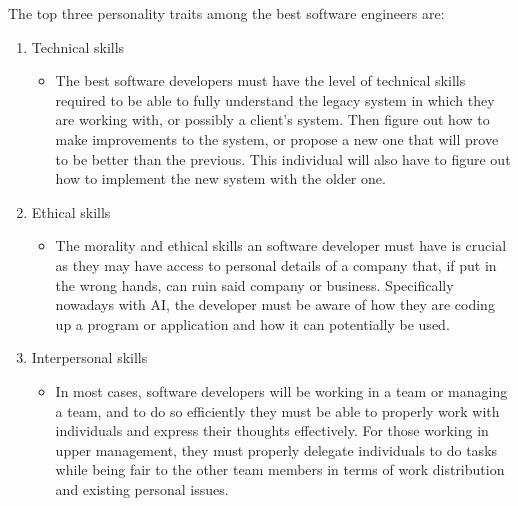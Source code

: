 	The top three personality traits among the best software engineers are:
	\begin{enumerate}
		\item Technical skills
			\begin{itemize}
				\item The best software developers must have the level of technical skills required to be able to fully understand the legacy system in which they are working with, or possibly a client's system. Then figure out how to make improvements to the system, or propose a new one that will prove to be better than the previous. This individual will also have to figure out how to implement the new system with the older one.
			\end{itemize}
		\item Ethical skills
			\begin{itemize}
				\item The morality and ethical skills an software developer must have is crucial as they may have access to personal details of a company that, if put in the wrong hands, can ruin said company or business. Specifically nowadays with AI, the developer must be aware of how they are coding up a program or application and how it can potentially be used. 
			\end{itemize}
		\item Interpersonal skills
			\begin{itemize}
				\item In most cases, software developers will be working in a team or managing a team, and to do so efficiently they must be able to properly work with individuals and express their thoughts effectively. For those working in upper management, they must properly delegate individuals to do tasks while being fair to the other team members in terms of work distribution and existing personal issues.
			\end{itemize}
	\end{enumerate}

